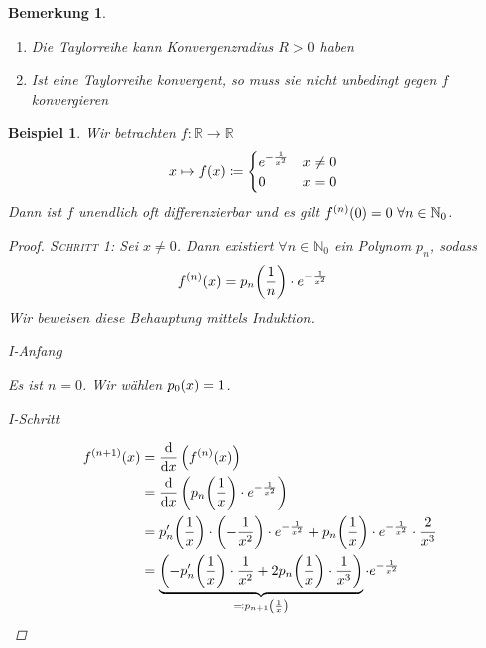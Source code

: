 \documentclass[11pt, twoside, a4paper]{article}
\theoremstyle{plain}
\newtheorem{bemerkung}[blockelement]{Bemerkung}
\newtheorem{beispiel}[blockelement]{Beispiel}
\numberwithin{equation}{subsection}
\newcommand{\pair}[1]{\left(#1\right)}
\newcommand{\of}[1]{\mathopen{}\mathclose{}\bgroup\left(#1\aftergroup\egroup\right)}
\newcommand{\fromto}{\rightarrow{}}
\newcommand{\definedasbackwards}[0]{\eqqcolon}
\newcommand{\dif}{\mathop{}\!\mathrm{d}}
\newcommand{\theoremescape}{\leavevmode}
\newcommand{\R}{\mathbb{R}}
\newcommand{\N}{\mathbb{N}}
\newenvironment{induktionsanfang}{
    \rule{0pt}{3ex}\noindent
    \begin{minipage}[t]{0.11\textwidth}
    {I-Anfang}
    \end{minipage}
    \hfill
    \begin{minipage}[t]{0.89\textwidth}
    }
    {
    \end{minipage}
}
\newenvironment{induktionsschritt}{
    \rule{0pt}{3ex}\noindent
    \begin{minipage}[t]{0.11\textwidth}
    {I-Schritt}
    \end{minipage}
    \hfill
    \begin{minipage}[t]{0.89\textwidth}
    }
    {
    \end{minipage}
}
\begin{document}
    \begin{bemerkung}
        \theoremescape
        \begin{enumerate}[label=(\roman*)]
            \item Die Taylorreihe kann Konvergenzradius $R > 0$ haben
            \item Ist eine Taylorreihe konvergent, so muss sie nicht unbedingt gegen $f$ konvergieren
        \end{enumerate}
    \end{bemerkung}

    \begin{beispiel}
        Wir betrachten $f: \R\fromto\R$
        \begin{align*}
            x\mapsto f\of{x}&\coloneqq \begin{cases}
                                           e^{-\frac{1}{x^2}} & x\neq 0\\
                                           0 &x=0
            \end{cases}
        \end{align*}
        Dann ist $f$ unendlich oft differenzierbar und es gilt $f^{(n)}\of{0} = 0~\forall n\in\N_0$.
        \begin{proof}
            \textsc{Schritt 1}: Sei $x\neq 0$. Dann existiert $\forall n\in\N_0$ ein Polynom $p_n$, sodass
            \begin{align*}
                f^{(n)}\of{x} &= p_n\of{\frac{1}{n}}\cdot e^{-\frac{1}{x^2}}
            \end{align*}
            Wir beweisen diese Behauptung mittels Induktion.~\\
            \begin{induktionsanfang}
                Es ist $n=0$. Wir wählen $p_0\of{x} = 1$.
            \end{induktionsanfang}
            \begin{induktionsschritt}
                \begin{align*}
                    f^{(n+1)}\of{x} &= \frac{\dif}{\dif x}\pair{f^{(n)}\of{x}}\\
                    &= \frac{\dif}{\dif x}\pair{p_n\of{\frac{1}{x}}\cdot e^{-\frac{1}{x^2}}}\\
                    &= p_n'\of{\frac{1}{x}}\cdot\pair{-\frac{1}{x^2}}\cdot e^{-\frac{1}{x^2}} + p_n\of{\frac{1}{x}}\cdot e^{-\frac{1}{x^2}}\cdot\frac{2}{x^3}\\
                    &= \underbrace{\pair{-p_n'\of{\frac{1}{x}}\cdot\frac{1}{x^2} + 2p_n\of{\frac{1}{x}}\cdot\frac{1}{x^3}}}_{\definedasbackwards p_{n+1}\of{\frac{1}{x}}}\cdot e^{-\frac{1}{x^2}}\\

\end{align*}
\end{induktionsschritt}
\end{proof}
\end{beispiel}
\end{document}
